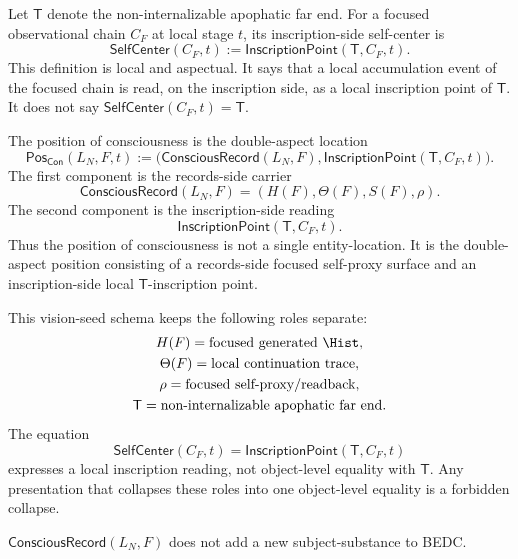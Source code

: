 \begin{definition}
\label{def:inscription-side-self-center}
Let $\mathsf{T}$ denote the non-internalizable apophatic far end. For a
focused observational chain $C_F$ at local stage $t$, its
inscription-side self-center is
$$
\mathsf{SelfCenter}(C_F,t)
:=
\mathsf{InscriptionPoint}(\mathsf{T},C_F,t).
$$
This definition is local and aspectual. It says that a local accumulation
event of the focused chain is read, on the inscription side, as a local
inscription point of $\mathsf{T}$. It does not say
$\mathsf{SelfCenter}(C_F,t)=\mathsf{T}$.
\end{definition}

\begin{definition}
\label{def:position-of-consciousness}
The position of consciousness is the double-aspect location
$$
\mathsf{Pos}_{\mathsf{Con}}(L_N,F,t)
:=
\bigl(
\mathsf{ConsciousRecord}(L_N,F),
\mathsf{InscriptionPoint}(\mathsf{T},C_F,t)
\bigr).
$$
The first component is the records-side carrier
$$
\mathsf{ConsciousRecord}(L_N,F)
=
(H(F),\Theta(F),S(F),\rho).
$$
The second component is the inscription-side reading
$$
\mathsf{InscriptionPoint}(\mathsf{T},C_F,t).
$$
Thus the position of consciousness is not a single entity-location. It is
the double-aspect position consisting of a records-side focused self-proxy
surface and an inscription-side local $\mathsf{T}$-inscription point.
\end{definition}

\begin{definition}
\label{def:position-consciousness-role-discipline}
This vision-seed schema keeps the following roles separate:
$$
\begin{gathered}
H(F)=\text{focused generated }\Hist,\\
\Theta(F)=\text{local continuation trace},\\
\rho=\text{focused self-proxy/readback},\\
\mathsf{T}=\text{non-internalizable apophatic far end}.
\end{gathered}
$$
The equation
$$
\mathsf{SelfCenter}(C_F,t)
=
\mathsf{InscriptionPoint}(\mathsf{T},C_F,t)
$$
expresses a local inscription reading, not object-level equality with
$\mathsf{T}$. Any presentation that collapses these roles into one
object-level equality is a forbidden collapse.
\end{definition}

\begin{theorem}
\label{thm:consciousness-adds-no-subject-substance}
$\mathsf{ConsciousRecord}(L_N,F)$ does not add a new subject-substance to
BEDC.
\end{theorem}

